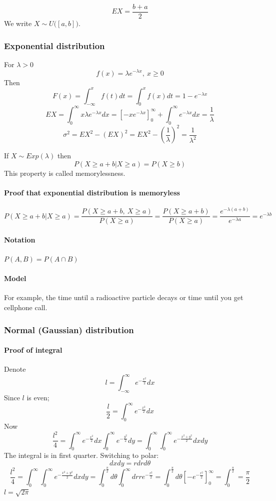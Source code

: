 $$EX = \frac{b+a}{2}$$
We write $X \sim U\big( [a,b] \big)$.

\begin{center}	
	
\end{center}
\subsubsection{Exponential distribution}
For $\lambda > 0$
$$f(x) = \lambda e^{-\lambda x}, \: x \geq 0$$
Then $$F(x) = \int_{-\infty}^x f(t) dt = \int_0^x f(x) dt = 1-e^{-\lambda x}$$
$$EX = \int_0^\infty x \lambda e^{-\lambda x} dx = \left[ -xe^{-\lambda x} \right]_0^\infty + \int_0^\infty e^{-\lambda x}dx = \frac{1}{\lambda }$$
$$\sigma^2 = EX^2 - (EX)^2 = EX^2 - \left(\frac{1}{\lambda}\right)^2 = \frac{1}{\lambda^2} $$

\begin{center}	
	
\end{center}

If $X \sim Exp(\lambda)$ then 
$$P(X \geq a+b | X\geq a) = P(X \geq b)$$
This property is called memorylessness.
\paragraph{Proof that exponential distribution is memoryless}
$$P(X \geq a+b | X \geq a)= \frac{P(X \geq a+b, \: X \geq a)}{P(X \geq a)}= \frac{P(X \geq a+b) }{P(X \geq a)} = \frac{e^{-\lambda(a+b)}}{e^{-\lambda a}}=e^{-\lambda b}$$ 
\paragraph{Notation}
$P(A,B) = P(A \cap B)$
\paragraph{Model}
For example, the time until a radioactive particle decays or time until you get cellphone call.


\subsubsection{Normal (Gaussian) distribution}
\paragraph{Proof of integral}
Denote $$l =  \int_{-\infty}^\infty  e^{-\frac{x^2}{2}}dx$$
Since $l$ is even;
$$\frac{l}{2} =  \int_{0}^\infty  e^{-\frac{x^2}{2}}dx$$
Now
$$\frac{l^2}{4} =  \int_{0}^\infty  e^{-\frac{x^2}{2}}dx\int_{0}^\infty  e^{-\frac{y^2}{2}}dy = \int_{0}^\infty \int_{0}^\infty  e^{-\frac{x^2+y^2}{2}}dxdy$$
The integral is in first quarter. Switching to polar:
$$dxdy = rdr d\theta$$
$$\frac{l^2}{4}  = \int_{0}^\infty \int_{0}^\infty  e^{-\frac{x^2+y^2}{2}}dxdy = \int_0^\frac{\pi}{2} d\theta \int_0^\infty dr re^{-\frac{r^2}{2}} =  \int_0^\frac{\pi}{2} d\theta \left[ -e^{-\frac{r^2}{2}} \right]_0^\infty =  \int_0^\frac{\pi}{2} = \frac{\pi}{2}$$
$l = \sqrt{2\pi}$
